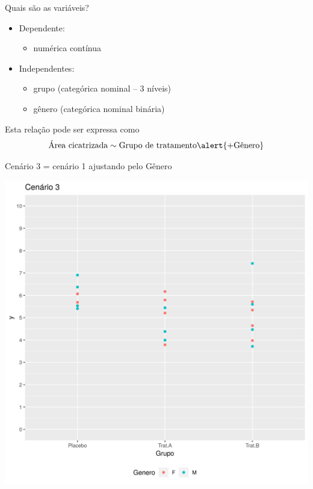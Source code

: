 \documentclass{beamer}
\begin{document}
\begin{frame}{\scriptsize Quais são as variáveis?}
  \begin{itemize}
    \footnotesize
  \item Dependente:
    \begin{itemize}
      \scriptsize
    \item numérica contínua
    \end{itemize}
  \item Independentes:
    \begin{itemize}
      \scriptsize
    \item grupo (categórica nominal -- 3 níveis)
    \item \alert{gênero (categórica nominal binária)}
    \end{itemize}
  \end{itemize}
  \vfill
  \begin{block}{Esta relação pode ser expressa como}
    \begin{displaymath}
      \text{Área cicatrizada} \sim \text{Grupo de tratamento} \alert{+ \text{Gênero}}
    \end{displaymath}
  \end{block}
\end{frame}



\begin{frame}[label=cenario3]{\scriptsize Cenário 3 = cenário 1 ajustando pelo Gênero}
  \begin{center}
    \includegraphics[height=.9\textheight]{Cap13-30/cenario12}
  \end{center}
\end{frame}
\end{document}
